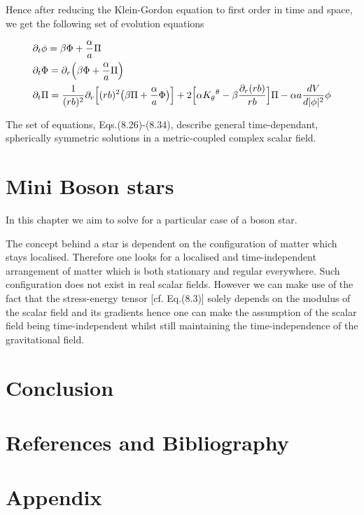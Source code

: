\documentclass[12pt]{article}
\numberwithin{equation}{section}
\numberwithin{theorem}{subsection}
\begin{document}
 Hence after reducing the Klein-Gordon equation to first order in time and space, we get the following set of evolution equations

\begin{align}

    &\partial_{t}\phi = \beta\Phi+\frac{\alpha}{a}\Pi \\

    &\partial_{t}\Phi = \partial_{r}\Big(\beta\Phi+\frac{\alpha}{a}\Pi \Big) \\

    &\partial_{t}\Pi = \frac{1}{(rb)^{2}} \partial_{r}\Big[(rb)^{2} \big(\beta\Pi + \frac{\alpha}{a}\Phi \big) \Big] + 2 \Big[\alpha\tensor{K}{_\theta^\theta} - \beta\frac{\partial_{r}(rb)}{rb} \Big]\Pi - \alpha a \frac{dV}{d|\phi|^{2}}\phi

\end{align}

The set of equations, Eqs.(8.26)-(8.34), describe general time-dependant, spherically symmetric solutions in a metric-coupled complex scalar field. 



\section{Mini Boson stars}

In this chapter we aim to solve for a particular case of a boson star. 

\newline The concept behind a star is dependent on the configuration of matter which stays localised. Therefore one looks for a localised and time-independent arrangement of matter which is both stationary and regular everywhere. Such configuration does not exist in real scalar fields. However we can make use of the fact that the stress-energy tensor [cf. Eq.(8.3)] solely depends on the modulus of the scalar field and its gradients hence one can make the assumption of the scalar field being time-independent whilst still maintaining the time-independence of the gravitational field. 



\section{Conclusion}




\section{References and Bibliography}

\section{Appendix}
\end{document}
